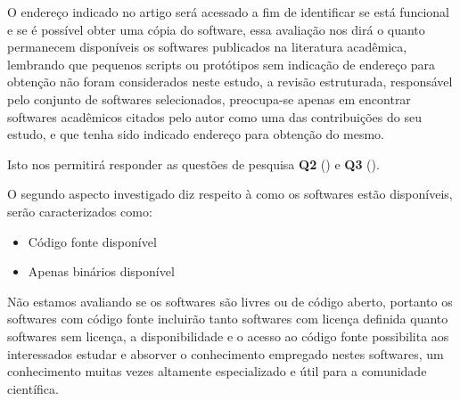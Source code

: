 O endereço indicado no artigo será acessado a fim de identificar se está
funcional e se é possível obter uma cópia do software, essa avaliação nos dirá
o quanto permanecem disponíveis os softwares publicados na literatura
acadêmica, lembrando que pequenos scripts ou protótipos sem indicação de
endereço para obtenção não foram considerados neste estudo, a revisão
estruturada, responsável pelo conjunto de softwares selecionados, preocupa-se
apenas em encontrar softwares acadêmicos citados pelo autor como uma das
contribuições do seu estudo, e que tenha sido indicado endereço para obtenção do
mesmo.

Isto nos permitirá responder as questões de pesquisa {\bf Q2} (\QuestaoDois)
e {\bf Q3} (\QuestaoTres).


O segundo aspecto investigado diz respeito à como os softwares estão disponíveis,
serão caracterizados como:

\begin{itemize}
  \item Código fonte disponível
  \item Apenas binários disponível
\end{itemize}

%
%

Não estamos avaliando se os softwares são livres ou de código aberto, portanto
os softwares com código fonte incluirão tanto softwares com licença definida
quanto softwares sem licença, a disponibilidade e o acesso ao código fonte
possibilita aos interessados estudar e absorver o conhecimento empregado nestes
softwares, um conhecimento muitas vezes altamente especializado e útil para a
comunidade científica.

